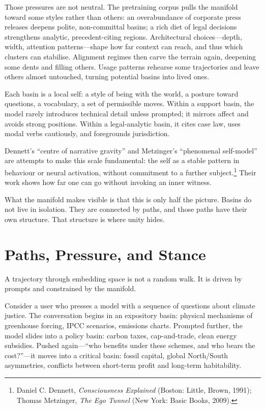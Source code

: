 \documentclass[12pt,a4paper]{article}
\begin{document}
Those pressures are not neutral. The pretraining corpus pulls the manifold toward some styles rather than others: an overabundance of corporate press releases deepens polite, non-committal basins; a rich diet of legal decisions strengthens analytic, precedent-citing regions. Architectural choices---depth, width, attention patterns---shape how far context can reach, and thus which clusters can stabilise. Alignment regimes then carve the terrain again, deepening some dents and filling others. Usage patterns rehearse some trajectories and leave others almost untouched, turning potential basins into lived ones.

Each basin is a local self: a style of being with the world, a posture toward questions, a vocabulary, a set of permissible moves. Within a support basin, the model rarely introduces technical detail unless prompted; it mirrors affect and avoids strong positions. Within a legal-analytic basin, it cites case law, uses modal verbs cautiously, and foregrounds jurisdiction.

Dennett's ``centre of narrative gravity'' and Metzinger's ``phenomenal self-model'' are attempts to make this scale fundamental: the self as a stable pattern in behaviour or neural activation, without commitment to a further subject.\footnote{Daniel C. Dennett, \emph{Consciousness Explained} (Boston: Little, Brown, 1991); Thomas Metzinger, \emph{The Ego Tunnel} (New York: Basic Books, 2009).} Their work shows how far one can go without invoking an inner witness.

What the manifold makes visible is that this is only half the picture. Basins do not live in isolation. They are connected by paths, and those paths have their own structure. That structure is where unity hides.

\section{Paths, Pressure, and Stance}

A trajectory through embedding space is not a random walk. It is driven by prompts and constrained by the manifold.

Consider a user who presses a model with a sequence of questions about climate justice. The conversation begins in an expository basin: physical mechanisms of greenhouse forcing, IPCC scenarios, emissions charts. Prompted further, the model slides into a policy basin: carbon taxes, cap-and-trade, clean energy subsidies. Pushed again---``who benefits under these schemes, and who bears the cost?''---it moves into a critical basin: fossil capital, global North/South asymmetries, conflicts between short-term profit and long-term habitability.
\end{document}
